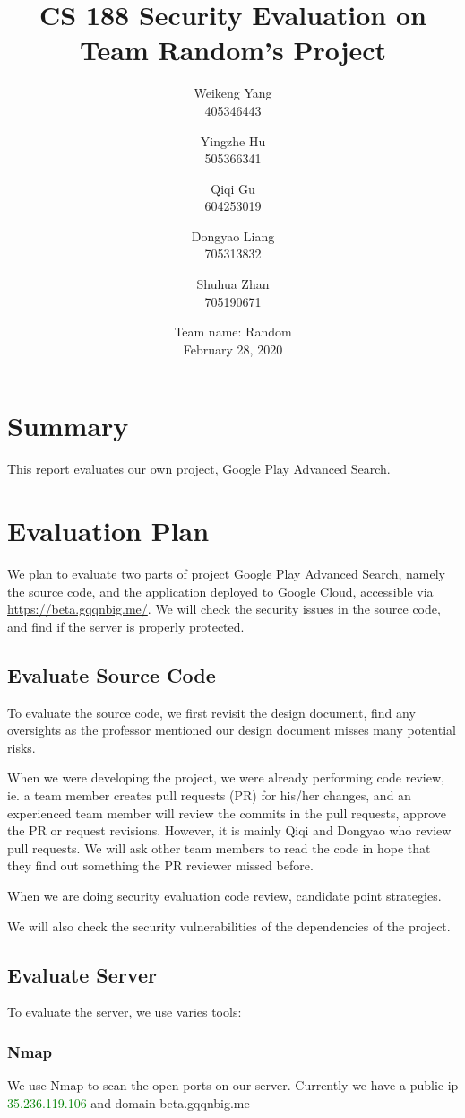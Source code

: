 \documentclass[12pt, a4paper]{article}
\title{CS 188 Security Evaluation on Team Random's Project}
\author{Weikeng Yang\\405346443 \and
Yingzhe Hu\\505366341 \and
Qiqi Gu\\604253019 \and
Dongyao Liang\\705313832 \and
Shuhua Zhan\\705190671}
\date{Team name: Random\\[2mm]February 28, 2020}
\begin{document}
\maketitle

\section{Summary}


This report evaluates our own project, Google Play Advanced Search.




\section{Evaluation Plan}

We plan to evaluate two parts of project Google Play Advanced Search, namely the source code, and the application deployed to Google Cloud, accessible via \url{https://beta.gqqnbig.me/}. We will check the security issues in the source code, and find if the server is properly protected.

\subsection{Evaluate Source Code}
To evaluate the source code, we first revisit the design document, find any oversights as the professor mentioned our design document misses many potential risks.

When we were developing the project, we were already performing code review, ie. a team member creates pull requests (PR) for his/her changes, and an experienced team member will review the commits in the pull requests, approve the PR or request revisions. However, it is mainly Qiqi and Dongyao who review pull requests. We will ask other team members to read the code in hope that they find out something the PR reviewer missed before.

When we are doing security evaluation code review, candidate point strategies.

We will also check the security vulnerabilities of the dependencies of the project.


\subsection{Evaluate Server}
To evaluate the server, we use varies tools:

\subsubsection{Nmap}
We use Nmap to scan the open ports on our server. Currently we have a public ip \textcolor{green}{35.236.119.106} and domain beta.gqqnbig.me
\end{document}
